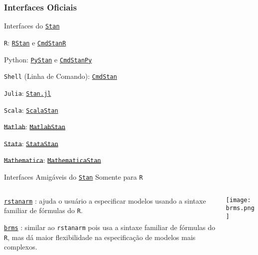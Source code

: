 \subsubsection{Interfaces Oficiais}
\begin{frame}{Interfaces do \href{https://mc-stan.org}{\texttt{Stan}}}
    \begin{vfilleditems}
        \item \texttt{R}: \href{https://mc-stan.org/users/interfaces/rstan.html}{\texttt{RStan}} e \href{https://mc-stan.org/cmdstanr}{\texttt{CmdStanR}}
        \item Python: \href{https://mc-stan.org/users/interfaces/pystan.html}{\texttt{PyStan}} e \href{https://cmdstanpy.readthedocs.io/en/latest/getting_started.html}{\texttt{CmdStanPy}}
        \item \texttt{Shell} (Linha de Comando): \href{https://mc-stan.org/users/interfaces/cmdstan.html}{\texttt{CmdStan}}
        \item \texttt{Julia}: \href{https://mc-stan.org/users/interfaces/julia-stan.html}{\texttt{Stan.jl}}
        \item \texttt{Scala}: \href{https://github.com/cibotech/ScalaStan}{\texttt{ScalaStan}}
        \item \sout{\texttt{Matlab}}: \href{https://mc-stan.org/users/interfaces/matlab-stan.html}{\sout{\texttt{MatlabStan}}}
        \item \sout{\texttt{Stata}}: \href{https://mc-stan.org/users/interfaces/stata-stan.html}{\sout{\texttt{StataStan}}}
        \item \sout{\texttt{Mathematica}}: \href{https://mc-stan.org/users/interfaces/mathematica-stan.html}{\sout{\texttt{MathematicaStan}}}
    \end{vfilleditems}
\end{frame}

\begin{frame}{Interfaces Amigáveis do \href{https://mc-stan.org}{\texttt{Stan}}}
Somente para \texttt{R}
    \begin{columns}
        \begin{column}{0.8\textwidth}
            \begin{vfilleditems}
                \item \href{http://mc-stan.org/rstanarm/}{\texttt{rstanarm}} \parencite{rstanarm}: ajuda o usuário a especificar modelos usando a sintaxe familiar de fórmulas do \texttt{R}.
                \item \href{https://paul-buerkner.github.io/brms/}{\texttt{brms}} \parencite{brms}: similar ao \texttt{rstanarm} pois usa a sintaxe familiar de fórmulas do \texttt{R}, mas dá maior flexibilidade na especificação de modelos mais complexos.
            \end{vfilleditems}
        \end{column}
        \begin{column}{0.2\textwidth}
            \centering
            \texttt{[image: brms.png]}
        \end{column}
    \end{columns}
\end{frame}

